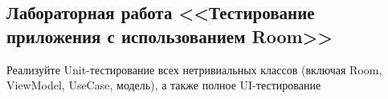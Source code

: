 \subsection{Лабораторная работа <<Тестирование приложения с использованием Room>>}

Реализуйте Unit-тестирование всех нетривиальных классов (включая Room, ViewModel, UseCase, модель), а также 
полное UI-тестирование